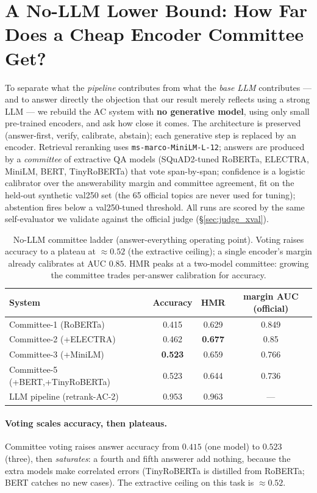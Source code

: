 \documentclass[11pt,a4paper]{article}
\begin{document}
\section{A No-LLM Lower Bound: How Far Does a Cheap Encoder Committee Get?}
\label{sec:nollm}
To separate what the \emph{pipeline} contributes from what the \emph{base LLM}
contributes --- and to answer directly the objection that our result merely
reflects using a strong LLM --- we rebuild the AC system with \textbf{no
generative model}, using only small pre-trained encoders, and ask how close it
comes. The architecture is preserved (answer-first, verify, calibrate, abstain);
each generative step is replaced by an encoder. Retrieval reranking uses
\texttt{ms-marco-MiniLM-L-12}; answers are produced by a \emph{committee} of
extractive QA models (SQuAD2-tuned RoBERTa, ELECTRA, MiniLM, BERT, TinyRoBERTa)
that vote span-by-span; confidence is a logistic calibrator over the
answerability margin and committee agreement, fit on the held-out synthetic
val250 set (the 65 official topics are never used for tuning); abstention fires
below a val250-tuned threshold. All runs are scored by the same self-evaluator we
validate against the official judge (\S\ref{sec:judge_xval}).

\begin{table}[t]
\centering\small
\caption{No-LLM committee ladder (answer-everything operating point). Voting
raises accuracy to a plateau at $\approx0.52$ (the extractive ceiling); a single
encoder's margin already calibrates at AUC $0.85$. HMR peaks at a two-model
committee: growing the committee trades per-answer calibration for accuracy.}
\label{tab:nollm}
\begin{tabular}{lccc}
\toprule
System & Accuracy & HMR & margin AUC (official) \\
\midrule
Committee-1 (RoBERTa)          & 0.415 & 0.629 & 0.849 \\
Committee-2 (+ELECTRA)         & 0.462 & \textbf{0.677} & 0.85 \\
Committee-3 (+MiniLM)          & \textbf{0.523} & 0.659 & 0.766 \\
Committee-5 (+BERT,+TinyRoBERTa) & 0.523 & 0.644 & 0.736 \\
\midrule
LLM pipeline (retrank-AC-2)    & 0.953 & 0.963 & --- \\
\bottomrule
\end{tabular}
\end{table}

\paragraph{Voting scales accuracy, then plateaus.} Committee voting raises answer
accuracy from $0.415$ (one model) to $0.523$ (three), then \emph{saturates}: a
fourth and fifth answerer add nothing, because the extra models make correlated
errors (TinyRoBERTa is distilled from RoBERTa; BERT catches no new cases). The
extractive ceiling on this task is $\approx0.52$.
\end{document}
